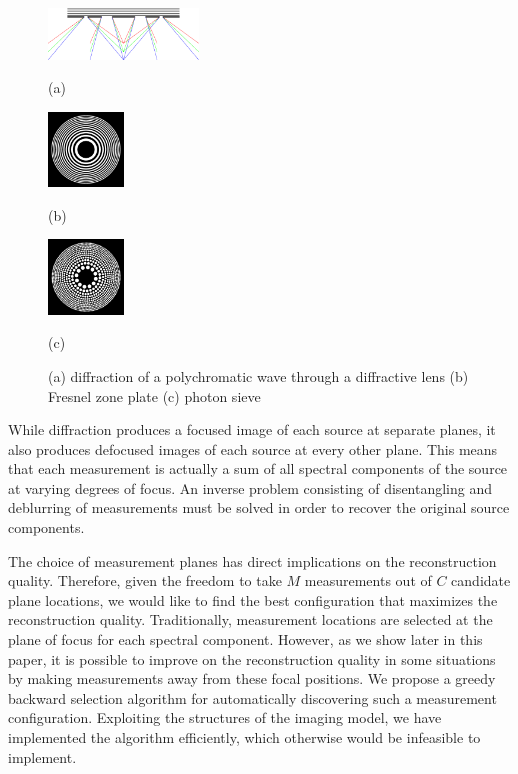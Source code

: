 \documentclass{article}
\begin{document}
\begin{figure}[htb]

\begin{minipage}[b]{0.48\linewidth}
  \centering
  \centerline{\includegraphics[width=4.0cm]{diffraction_ps_rgb}}
  \centerline{(a)}\medskip
\end{minipage}
\hfill
\begin{minipage}[b]{0.24\linewidth}
  \centering
  \centerline{\includegraphics[width=2.0cm]{zoneplate}}
  \centerline{(b)}\medskip
\end{minipage}
\hfill
\begin{minipage}[b]{0.24\linewidth}
  \centering
  \centerline{\includegraphics[width=2.0cm]{photonsieve}}
  \centerline{(c)}\medskip
\end{minipage}
\caption{(a) diffraction of a polychromatic wave through a diffractive lens (b) Fresnel zone
plate (c) photon sieve}
\label{fig:diff_lens}
%
\end{figure}

While diffraction produces a focused image of each source at separate planes, it
also produces defocused images of each source at every other plane. This means
that each measurement is actually a sum of all spectral components of the source
at varying degrees of focus. An inverse problem consisting of disentangling and
deblurring of measurements must be solved in order to recover the original
source components.

The choice of measurement planes has direct implications on the reconstruction
quality. Therefore, given the freedom to take $M$ measurements out of $C$
candidate plane locations, we would like to find the best configuration that
maximizes the reconstruction quality. Traditionally, measurement
locations are selected at the plane of focus for each spectral component.
However, as we show later in this paper, it is possible to improve on the
reconstruction quality in some situations by making measurements away from these
focal positions. We propose a greedy backward selection algorithm for
automatically discovering such a measurement configuration. Exploiting the
structures of the imaging model, we have implemented the algorithm efficiently,
which otherwise would be infeasible to implement.
\end{document}
